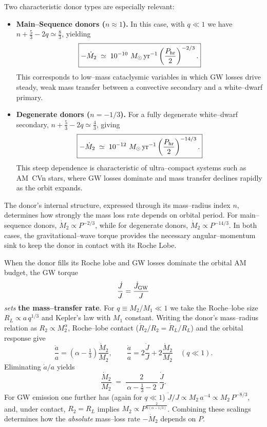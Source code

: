 Two characteristic donor types are especially relevant:

\begin{itemize}
    \item \textbf{Main--Sequence donors ($n \approx 1$).}  
    In this case, with $q \ll 1$ we have $n + \tfrac{5}{3} - 2q \simeq \tfrac{8}{3}$, yielding
    \[
    \boxed{
    -\dot{M}_2 \;\simeq\;
    10^{-10}\ M_\odot\,{\rm yr^{-1}}
    \left(\frac{P_{\rm hr}}{2}\right)^{-2/3}.
    }
    \]
    This corresponds to low--mass cataclysmic variables in which GW losses drive steady,
    weak mass transfer between a convective secondary and a white--dwarf primary.

    \item \textbf{Degenerate donors ($n = -1/3$).}  
    For a fully degenerate white--dwarf secondary, $n + \tfrac{5}{3} - 2q \simeq \tfrac{4}{3}$, giving
    \[
    \boxed{
    -\dot{M}_2 \;\simeq\;
    10^{-12}\ M_\odot\,{\rm yr^{-1}}
    \left(\frac{P_{\rm hr}}{2}\right)^{-14/3}.
    }
    \]
    This steep dependence is characteristic of ultra--compact systems such as AM~CVn stars, 
    where GW losses dominate and mass transfer declines rapidly as the orbit expands.
\end{itemize}

\begin{bigidea}
The donor’s internal structure, expressed through its mass–radius index $n$, determines how strongly the mass loss rate depends on orbital period.  
For main–sequence donors, $\dot{M}_2 \propto P^{-2/3}$, while for degenerate donors, $\dot{M}_2 \propto P^{-14/3}$.  
In both cases, the gravitational–wave torque provides the necessary angular–momentum sink to keep the donor in contact with its Roche Lobe.
\end{bigidea}





When the donor fills its Roche lobe and GW losses dominate the orbital AM budget, the GW torque
\[
\frac{\dot{J}}{J}=\frac{\dot{J}_{\rm GW}}{J}
\]
\emph{sets} \textbf{the mass–transfer rate}. For $q\!\equiv\!M_2/M_1\!\ll\!1$ we take the Roche–lobe size $R_{L}\propto a\,q^{1/3}$ and Kepler’s law with $M_1$ constant. Writing the donor’s mass–radius relation as $R_2\propto M_2^\alpha$, Roche–lobe contact
($\dot{R}_2/R_2=\dot{R}_L/R_L$) and the orbital response give
\[
\frac{\dot{a}}{a}=(\alpha-\tfrac13)\frac{\dot{M}_2}{M_2},\qquad
\frac{\dot{a}}{a}=2\frac{\dot{J}}{J}+2\frac{\dot{M}_2}{M_2}\quad(q\ll1).
\]
Eliminating $\dot{a}/a$ yields
\[
\frac{\dot{M}_2}{M_2} \;=\;
\frac{2}{\,\alpha-\tfrac13-2\,}\,\frac{\dot{J}}{J}.
\]
For GW emission one further has (again for $q\ll1$) $\dot{J}/J\propto M_2\,a^{-4}\propto M_2\,P^{-8/3}$, 
and, under contact, $R_2\!=\!R_L$ implies $M_2 \propto P^{\frac{2}{3(\alpha-1/3)}}$.
Combining these scalings determines how the \emph{absolute} mass–loss rate $-\dot{M}_2$ depends on $P$.

